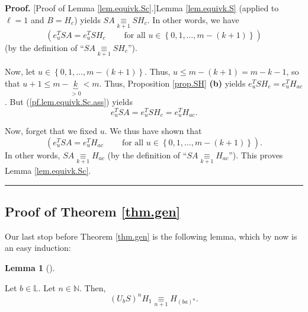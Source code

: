 \documentclass[numbers=enddot,12pt,final,onecolumn,notitlepage]{scrartcl}%
\theoremstyle{definition}
\newtheorem{lem}[theo]{Lemma}
\newenvironment{lemma}[1][]
{\begin{lem}[#1]\begin{leftbar}}
{\end{leftbar}\end{lem}}
\newenvironment{proof}[1][Proof]{\noindent\textbf{#1.} }{\ \rule{0.5em}{0.5em}}
\begin{document}
\begin{proof}
[Proof of Lemma \ref{lem.equivk.Sc}.]Lemma \ref{lem.equivk.S} (applied to
$\ell=1$ and $B=H_{c}$) yields $SA\underset{k+1}{\equiv}SH_{c}$. In other
words, we have
\begin{equation}
\left(  e_{u}^{T}SA=e_{u}^{T}SH_{c}\ \ \ \ \ \ \ \ \ \ \text{for all }%
u\in\left\{  0,1,\ldots,m-\left(  k+1\right)  \right\}  \right)
\label{pf.lem.equivk.Sc.ass}%
\end{equation}
(by the definition of \textquotedblleft$SA\underset{k+1}{\equiv}SH_{c}%
$\textquotedblright).

Now, let $u\in\left\{  0,1,\ldots,m-\left(  k+1\right)  \right\}  $. Thus,
$u\leq m-\left(  k+1\right)  =m-k-1$, so that $u+1\leq m-\underbrace{k}%
_{>0}<m$. Thus, Proposition \ref{prop.SH} \textbf{(b)} yields $e_{u}^{T}%
SH_{c}=e_{u}^{T}H_{ac}$. But (\ref{pf.lem.equivk.Sc.ass}) yields%
\[
e_{u}^{T}SA=e_{u}^{T}SH_{c}=e_{u}^{T}H_{ac}.
\]


Now, forget that we fixed $u$. We thus have shown that
\[
\left(  e_{u}^{T}SA=e_{u}^{T}H_{ac}\ \ \ \ \ \ \ \ \ \ \text{for all }%
u\in\left\{  0,1,\ldots,m-\left(  k+1\right)  \right\}  \right)  .
\]
In other words, $SA\underset{k+1}{\equiv}H_{ac}$ (by the definition of
\textquotedblleft$SA\underset{k+1}{\equiv}H_{ac}$\textquotedblright). This
proves Lemma \ref{lem.equivk.Sc}.
\end{proof}

\subsection{Proof of Theorem \ref{thm.gen}}

Our last stop before Theorem \ref{thm.gen} is the following lemma, which by
now is an easy induction:

\begin{lemma}
\label{lem.gen-lem}Let $b\in\mathbb{L}$. Let $n\in\mathbb{N}$. Then,%
\[
\left(  U_{b}S\right)  ^{n}H_{1}\underset{n+1}{\equiv}H_{\left(  ba\right)
^{n}}.
\]

\end{lemma}
\end{document}
